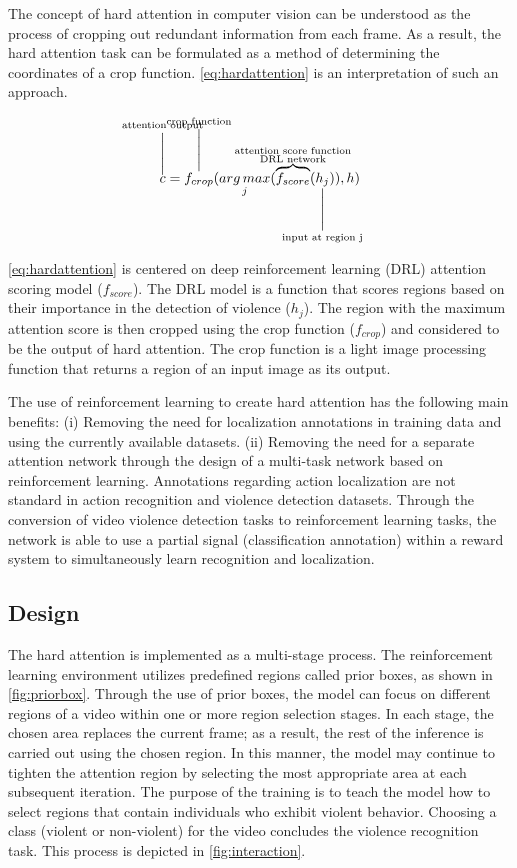 \documentclass[review]{elsarticle}
\begin{document}
The concept of hard attention in computer vision can be understood as the process of cropping out redundant information from each frame. As a result, the hard attention task can be formulated as a method of determining the coordinates of a crop function. \autoref{eq:hardattention} is an interpretation of such an approach.

\begin{equation}
\label{eq:hardattention}
\overset{\mathclap{\text{attention output}}}{\overset{\Biggl|}{c}} = \overset{\mathclap{\text{crop function}}}{\overset{\Biggl|}{f_{crop}}}(\underset{j}{arg\,max}( \overbrace{f_{score}}^{\mathclap{\substack{\text{attention score function} \\ \text{DRL network}}}} ( \underset{\mathclap{\substack{\text{input at region j}}}}{\underset{\Biggl|}{h_{j}}} )), h)
\end{equation}

\autoref{eq:hardattention} {is centered on deep reinforcement learning (DRL) attention scoring model ($f_{score}$). The DRL model is a function that scores regions based on their importance in the detection of violence ($h_{j}$). The region with the maximum attention score is then cropped using the crop function ($f_{crop}$) and considered to be the output of hard attention. The crop function is a light image processing function that returns a region of an input image as its output.}

The use of reinforcement learning to create hard attention has the following main benefits: (i) Removing the need for localization annotations in training data and using the currently available datasets. (ii) Removing the need for a separate attention network through the design of a multi-task network based on reinforcement learning. Annotations regarding action localization are not standard in action recognition and violence detection datasets. Through the conversion of video violence detection tasks to reinforcement learning tasks, the network is able to use a partial signal (classification annotation) within a reward system to simultaneously learn recognition and localization.



\subsection{Design}
\label{3:2}

{The hard attention is implemented as a multi-stage process. The reinforcement learning environment utilizes predefined regions called prior boxes, as shown in} \autoref{fig:priorbox}{. Through the use of prior boxes, the model can focus on different regions of a video within one or more region selection stages. In each stage, the chosen area replaces the current frame; as a result, the rest of the inference is carried out using the chosen region. In this manner, the model may continue to tighten the attention region by selecting the most appropriate area at each subsequent iteration. The purpose of the training is to teach the model how to select regions that contain individuals who exhibit violent behavior. Choosing a class (violent or non-violent) for the video concludes the violence recognition task. This process is depicted in} \autoref{fig:interaction}.
\end{document}
